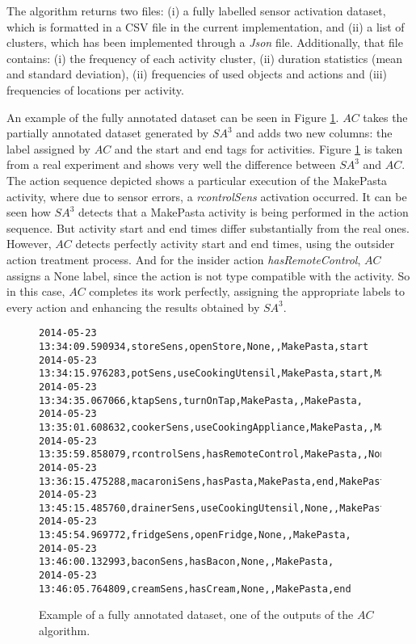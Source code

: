 The algorithm returns two files: (i) a fully labelled sensor activation dataset, which is formatted in a CSV file in the current implementation, and (ii) a list of clusters, which has been implemented through a \textit{Json} file. Additionally, that file contains: (i) the frequency of each activity cluster, (ii) duration statistics (mean and standard deviation), (ii) frequencies of used objects and actions and (iii) frequencies of locations per activity. 

An example of the fully annotated dataset can be seen in Figure \ref{fig-fully-annotated}. $AC$ takes the partially annotated dataset generated by $SA^3$ and adds two new columns: the label assigned by $AC$ and the start and end tags for activities. Figure \ref{fig-fully-annotated} is taken from a real experiment and shows very well the difference between $SA^3$ and $AC$. The action sequence depicted shows a particular execution of the MakePasta activity, where due to sensor errors, a \textit{rcontrolSens} activation occurred. It can be seen how $SA^3$ detects that a MakePasta activity is being performed in the action sequence. But activity start and end times differ substantially from the real ones. However, $AC$ detects perfectly activity start and end times, using the outsider action treatment process. And for the insider action \textit{hasRemoteControl}, $AC$ assigns a None label, since the action is not type compatible with the activity. So in this case, $AC$ completes its work perfectly, assigning the appropriate labels to every action and enhancing the results obtained by $SA^3$.

\begin{figure}[htbp]
\begin{scriptsize}
\begin{lstlisting}
2014-05-23 13:34:09.590934,storeSens,openStore,None,,MakePasta,start
2014-05-23 13:34:15.976283,potSens,useCookingUtensil,MakePasta,start,MakePasta,
2014-05-23 13:34:35.067066,ktapSens,turnOnTap,MakePasta,,MakePasta,
2014-05-23 13:35:01.608632,cookerSens,useCookingAppliance,MakePasta,,MakePasta,
2014-05-23 13:35:59.858079,rcontrolSens,hasRemoteControl,MakePasta,,None,
2014-05-23 13:36:15.475288,macaroniSens,hasPasta,MakePasta,end,MakePasta,
2014-05-23 13:45:15.485760,drainerSens,useCookingUtensil,None,,MakePasta,
2014-05-23 13:45:54.969772,fridgeSens,openFridge,None,,MakePasta,
2014-05-23 13:46:00.132993,baconSens,hasBacon,None,,MakePasta,
2014-05-23 13:46:05.764809,creamSens,hasCream,None,,MakePasta,end
\end{lstlisting}
\end{scriptsize}
\caption{Example of a fully annotated dataset, one of the outputs of the $AC$ algorithm.}
\label{fig-fully-annotated}
\end{figure}

